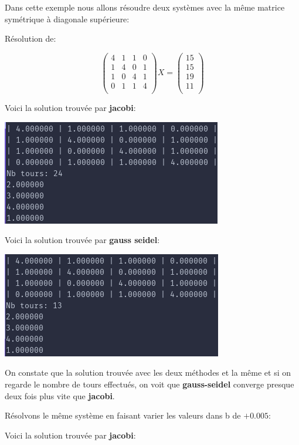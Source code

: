 \documentclass[a4paper]{article}
\begin{document}
Dans cette exemple nous allons résoudre deux systèmes avec la même matrice
symétrique à diagonale supérieure:

Résolution de:

\[
\begin{pmatrix}
  4 & 1 & 1 & 0\\
  1 & 4 & 0 & 1\\
  1 & 0 & 4 & 1\\
  0 & 1 & 1 & 4\\
\end{pmatrix} X =
\begin{pmatrix}
  15\\
  15\\
  19\\
  11\\
\end{pmatrix}
\]

Voici la solution trouvée par \textbf{jacobi}:

\includegraphics[scale=0.5]{./img/jacobi/jac_ex_1.png}

Voici la solution trouvée par \textbf{gauss seidel}:

\includegraphics[scale=0.5]{./img/gauss_seidel/g_e_ex_1.png}

On constate que la solution trouvée avec les deux méthodes et la même et si on
regarde le nombre de tours effectués, on voit que \textbf{gauss-seidel} converge
presque deux fois plus vite que \textbf{jacobi}.

Résolvons le même système en faisant varier les valeurs dans b de $+0.005$:

Voici la solution trouvée par \textbf{jacobi}:
\end{document}
